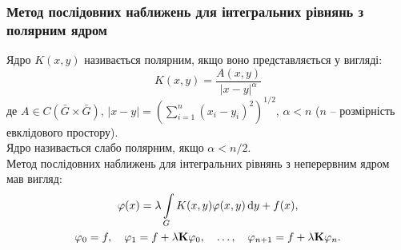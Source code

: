 
\subsubsection{Метод послідовних наближень для інтегральних рівнянь з полярним ядром}

Ядро $K(x, y)$ називається полярним, якщо воно представляється у вигляді:
\begin{equation}
	\label{eq:1.20}
	K(x, y) = \dfrac{A(x, y)}{|x - y|^\alpha}
\end{equation}
де $A \in C(\bar G \times \bar G)$, $|x - y| = \left( \sum_{i = 1}^n (x_i - y_i)^2 \right)^{1/2}$, $\alpha < n$ ($n$ -- розмірність евклідового простору). \\

Ядро називається слабо полярним, якщо $\alpha < n / 2$. \\

Метод послідовних наближень для інтегральних рівнянь з неперервним ядром мав вигляд: 
\begin{multline*}
\varphi(x) = \lambda \displaystyle\int\limits_G K(x, y) \varphi(x, y) \mathop{}\!\mathrm{d} y + f(x), \\
\varphi_0 = f, \quad \varphi_1 = f + \lambda \textbf{K} \varphi_0, \quad \ldots, \quad \varphi_{n + 1} = f + \lambda \textbf{K} \varphi_n.
\end{multline*}

